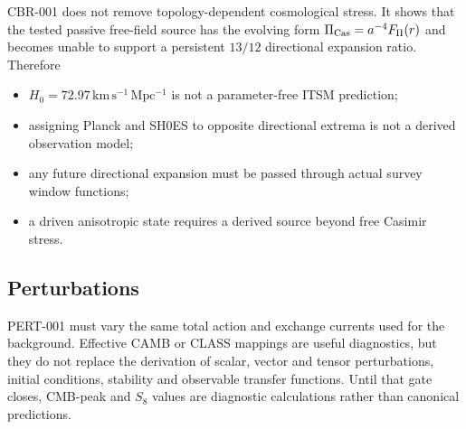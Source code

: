 CBR-001 does not remove topology-dependent cosmological stress.  It shows that
the tested passive free-field source has the evolving form
$\Pi_{\rm Cas}=a^{-4}F_\Pi(r)$ and becomes unable to support a persistent
$13/12$ directional expansion ratio.  Therefore
\begin{itemize}
\item $H_0=72.97\,\mathrm{km\,s^{-1}\,Mpc^{-1}}$ is not a parameter-free ITSM
prediction;
\item assigning Planck and SH0ES to opposite directional extrema is not a
derived observation model;
\item any future directional expansion must be passed through actual survey
window functions;
\item a driven anisotropic state requires a derived source beyond free Casimir
stress.
\end{itemize}

\subsection{Perturbations}

PERT-001 must vary the same total action and exchange currents used for the
background.  Effective CAMB or CLASS mappings are useful diagnostics, but they
do not replace the derivation of scalar, vector and tensor perturbations,
initial conditions, stability and observable transfer functions.  Until that
gate closes, CMB-peak and $S_8$ values are diagnostic calculations rather than
canonical predictions.
